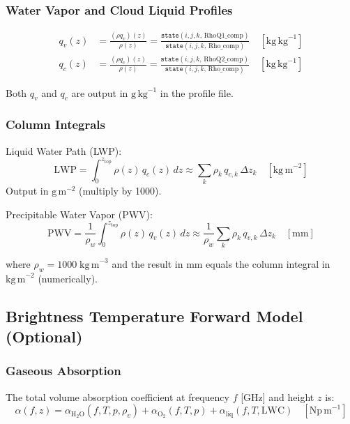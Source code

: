 \documentclass[11pt,letterpaper]{article}
\begin{document}
\subsubsection{Water Vapor and Cloud Liquid Profiles}

\begin{align}
  q_v(z) &= \frac{(\rho q_v)(z)}{\rho(z)}
  = \frac{\mathtt{state}(i,j,k,\,\text{RhoQ1\_comp})}{\mathtt{state}(i,j,k,\,\text{Rho\_comp})}
  \quad [\mathrm{kg\,kg}^{-1}] \\[4pt]
  q_c(z) &= \frac{(\rho q_c)(z)}{\rho(z)}
  = \frac{\mathtt{state}(i,j,k,\,\text{RhoQ2\_comp})}{\mathtt{state}(i,j,k,\,\text{Rho\_comp})}
  \quad [\mathrm{kg\,kg}^{-1}]
\end{align}

Both $q_v$ and $q_c$ are output in $\mathrm{g\,kg}^{-1}$ in the profile file.

\subsubsection{Column Integrals}

Liquid Water Path (LWP):
\begin{equation}
  \mathrm{LWP} = \int_0^{z_\mathrm{top}} \rho(z)\,q_c(z)\,dz
  \approx \sum_k \rho_k\,q_{c,k}\,\Delta z_k
  \quad [\mathrm{kg\,m}^{-2}]
  \label{eq:lwp}
\end{equation}
Output in $\mathrm{g\,m}^{-2}$ (multiply by 1000).

Precipitable Water Vapor (PWV):
\begin{equation}
  \mathrm{PWV} = \frac{1}{\rho_w}\int_0^{z_\mathrm{top}} \rho(z)\,q_v(z)\,dz
  \approx \frac{1}{\rho_w}\sum_k \rho_k\,q_{v,k}\,\Delta z_k
  \quad [\mathrm{mm}]
  \label{eq:pwv}
\end{equation}

\noindent where $\rho_w = 1000\;\mathrm{kg\,m}^{-3}$ and the result in mm equals
the column integral in $\mathrm{kg\,m}^{-2}$ (numerically).

\subsection{Brightness Temperature Forward Model (Optional)}

\subsubsection{Gaseous Absorption}

The total volume absorption coefficient at frequency $f$ [GHz] and height $z$ is:
\begin{equation}
  \alpha(f, z) = \alpha_{\mathrm{H_2O}}(f, T, p, \rho_v)
               + \alpha_{\mathrm{O_2}}(f, T, p)
               + \alpha_{\mathrm{liq}}(f, T, \mathrm{LWC})
  \quad [\mathrm{Np\,m}^{-1}]
\end{equation}
\end{document}
